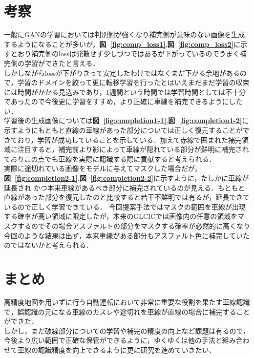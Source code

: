 \documentclass[a4j, 11pt]{jreport}
\newcommand{\figref}[1]{\textbf{図~\ref{#1}}}
\begin{document}
\chapter{考察}
一般にGANの学習においては判別側が強くなり補完側が意味のない画像を生成するようになることが多いが\cite{ITGANS}，\figref{fig:comp_loss1},\figref{fig:comp_loss2}に示すとおり補完側のlossは発散せず少しづつではあるが下がっているのでうまく補完側の学習ができたと言える．\\
\indent しかしながらlossが下がりきって安定したわけではなくまだ下がる余地があるので，学習のドメインを絞って更に転移学習を行ったとはいえまだまだ学習の収束には時間がかかる見込みであり，1週間という時間では学習時間としては不十分であったので今後更に学習をすすめ，より正確に車線を補完できるようにしたい．\\
\indent 学習後の生成画像については\figref{fig:completion1-1},\figref{fig:completion1-2}に示すようにもともと直線の車線があった部分については正しく復元することができており，学習が成功していることを示している．加えて赤線で囲まれた補完領域に注目すると，補完前より影によって車線が隠れている部分が鮮明に補完されておりこの点でも車線を実際に認識する際に貢献すると考えられる．\\
\indent 実際に途切れている画像をモデルに与えてマスクした場合だが，\figref{fig:completion2-1},\figref{fig:completion2-2}に示すように，たしかに車線が延長され
かつ本来車線があるべき部分に補完されているのが見える．もともと直線があった部分を復元したのと比較すると若干不鮮明では有るが，延長できているので正しく学習できている．
今回提案手法ではマスクの範囲を車線が出現する確率が高い領域に限定したが，本来のGLCICでは画像内の任意の領域をマスクするのでその場合アスファルトの部分をマスクする確率が必然的に高くなり今回のような結果は出ず，本来車線がある部分もアスファルト色に補完していたのではないかと考えられる．
\chapter{まとめ}
高精度地図を用いずに行う自動運転において非常に重要な役割を果たす車線認識で，誤認識の元になる車線のカスレや途切れを車線が直線の場合に補完することができた．\\しかし，まだ破線部分についての学習や補完の精度の向上など課題は有るので，今後より広い範囲で正確な保管ができるように，ゆくゆくは他の手法と組み合わせて車線の認識精度を向上できるように更に研究を進めていきたい．
\end{document}
